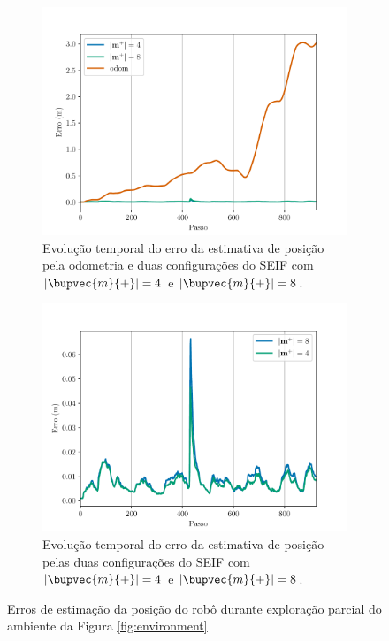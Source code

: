 \begin{figure}
  \centering
  \begin{subfigure}{.75\textwidth}
    \includegraphics[width=\textwidth]{figs/iae-odom-seif.pdf} 
    \caption{Evolução temporal do erro da estimativa de posição pela odometria e duas configurações do SEIF com $\lvert \bupvec{m}{+}\rvert = 4 $ e $\lvert \bupvec{m}{+}\rvert = 8 $.}
    \label{fig:iae-odom-and-seifs}
  \end{subfigure}
  \begin{subfigure}{.75\textwidth}
    \includegraphics[width=\textwidth]{figs/iae-seifs.pdf} 
    \caption{Evolução temporal do erro da estimativa de posição pelas duas configurações do SEIF com $\lvert \bupvec{m}{+}\rvert = 4 $ e $\lvert \bupvec{m}{+}\rvert = 8 $.}
    \label{fig:iae-seifs}
  \end{subfigure}
  \caption{Erros de estimação da posição do robô durante exploração parcial do ambiente da Figura \ref{fig:environment}}
  \label{fig:iae}
\end{figure}

